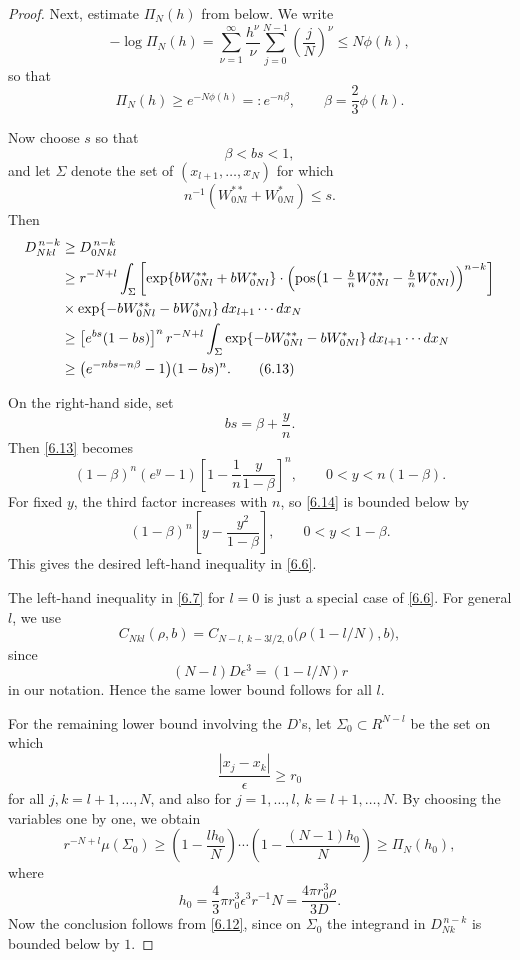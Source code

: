 \documentclass[10pt,a4paper]{amsart}
\begin{document}
\begin{proof}
Next, estimate $\Pi_N(h)$ from below. We write
\begin{equation*}
-\log \Pi_N(h)
=
\sum_{\nu=1}^\infty \frac{h^\nu}{\nu}\sum_{j=0}^{N-1}\left(\frac{j}{N}\right)^\nu
\le N\phi(h),
\tag{6.12}\label{6.12}
\end{equation*}
so that
\[
\Pi_N(h)\ge e^{-N\phi(h)}=:e^{-n\beta},
\qquad
\beta=\frac{2}{3}\phi(h).
\]

Now choose $s$ so that
\[
\beta<bs<1,
\]
and let $\Sigma$ denote the set of $(x_{l+1},\dots,x_N)$ for which
\[
n^{-1}(W^{**}_{0Nl}+W^{*}_{0Nl})\le s.
\]
Then
\begin{align*}
D^{\,n-k}_{Nkl}
&\ge D^{\,n-k}_{0Nkl}
\notag\\
&\ge
r^{-N+l}\int_\Sigma
\left[
\exp\{bW^{**}_{0Nl}+bW^{*}_{0Nl}\}
\cdot
\Bigl(\mathrm{pos}\bigl(1-\tfrac{b}{n}W^{**}_{0Nl}-\tfrac{b}{n}W^{*}_{0Nl}\bigr)\Bigr)^{n-k}
\right]
\notag\\
&\times
\exp\{-bW^{**}_{0Nl}-bW^{*}_{0Nl}\}\,dx_{l+1}\cdots dx_N\\
&\ge
\bigl[e^{bs}(1-bs)\bigr]^n
\, r^{-N+l}\int_\Sigma
\exp\{-bW^{**}_{0Nl}-bW^{*}_{0Nl}\}\,dx_{l+1}\cdots dx_N
\notag\\
&\ge
\bigl(e^{-nbs-n\beta}-1\bigr)(1-bs)^n.
\tag{6.13}\label{6.13}
\end{align*}

On the right-hand side, set
\[
bs=\beta+\frac{y}{n}.
\]
Then \eqref{6.13} becomes
\begin{equation}
(1-\beta)^n(e^y-1)\left[1-\frac{1}{n}\frac{y}{1-\beta}\right]^n,
\qquad
0<y<n(1-\beta).
\tag{6.14}\label{6.14}
\end{equation}
For fixed $y$, the third factor increases with $n$, so \eqref{6.14} is bounded below by
\[
(1-\beta)^n\left[y-\frac{y^2}{1-\beta}\right],
\qquad
0<y<1-\beta.
\]
This gives the desired left-hand inequality in \eqref{6.6}.

The left-hand inequality in \eqref{6.7} for $l=0$ is just a special case of \eqref{6.6}. For general $l$, we use
\begin{equation}
C_{Nkl}(\rho,b)
=
C_{N-l,\,k-3l/2,\,0}\bigl(\rho(1-l/N),b\bigr),
\tag{6.15}\label{6.15}
\end{equation}
since
\[
(N-l)D\epsilon^3=(1-l/N)r
\]
in our notation. Hence the same lower bound follows for all $l$.

For the remaining lower bound involving the $D$'s, let $\Sigma_0\subset R^{N-l}$ be the set on which
\[
\frac{|x_j-x_k|}{\epsilon}\ge r_0
\]
for all $j,k=l+1,\dots,N$, and also for $j=1,\dots,l$, $k=l+1,\dots,N$. By choosing the variables one by one, we obtain
\begin{equation}
r^{-N+l}\mu(\Sigma_0)
\ge
\left(1-\frac{lh_0}{N}\right)\cdots
\left(1-\frac{(N-1)h_0}{N}\right)
\ge
\Pi_N(h_0),
\tag{6.16}\label{6.16}
\end{equation}
where
\[
h_0=\frac{4}{3}\pi r_0^3\epsilon^3r^{-1}N=\frac{4\pi r_0^3\rho}{3D}.
\]
Now the conclusion follows from \eqref{6.12}, since on $\Sigma_0$ the integrand in $D^{\,n-k}_{Nk}$ is bounded below by $1$.
\end{proof}
\end{document}
